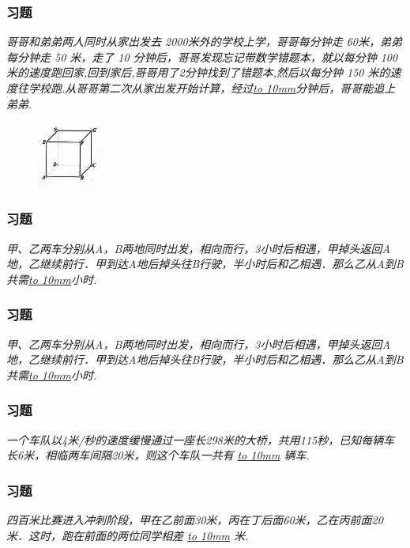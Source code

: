 \begin{frame}
    \frametitle{习题\theframecounter}
    \textit{哥哥和弟弟两人同时从家出发去 2000米外的学校上学，哥哥每分钟走 60米，弟弟每分钟走 50 米，走了 10 分钟后，哥哥发现忘记带数学错题本，就以每分钟 100 米的速度跑回家,回到家后,哥哥用了2分钟找到了错题本,然后以每分钟 150 米的速度往学校跑.从哥哥第二次从家出发开始计算，经过\underline{\hbox to 10mm{}}分钟后，哥哥能追上弟弟.}
    \begin{figure}[H] 
        \centering
        \includegraphics[width=0.2\textwidth]{./pics/Chapter_4/2.png}
    \end{figure}
\end{frame}

\begin{frame}
    \frametitle{习题\theframecounter}
    \textit{甲、乙两车分别从A，B两地同时出发，相向而行，3小时后相遇，甲掉头返回A地，乙继续前行．甲到达A地后掉头往B行驶，半小时后和乙相遇．那么乙从A到B共需\underline{\hbox to 10mm{}}小时.}
\end{frame}


\begin{frame}
    \frametitle{习题\theframecounter}
    \textit{甲、乙两车分别从A，B两地同时出发，相向而行，3小时后相遇，甲掉头返回A地，乙继续前行．甲到达A地后掉头往B行驶，半小时后和乙相遇．那么乙从A到B共需\underline{\hbox to 10mm{}}小时.}
\end{frame}

\begin{frame}
    \frametitle{习题\theframecounter}
    \textit{一个车队以4米/秒的速度缓慢通过一座长298米的大桥，共用115秒，已知每辆车长6米，相临两车间隔20米，则这个车队一共有 \underline{\hbox to 10mm{}} 辆车.}
\end{frame}


\begin{frame}
    \frametitle{习题\theframecounter}
    \textit{四百米比赛进入冲刺阶段，甲在乙前面30米，丙在丁后面60米，乙在丙前面20米．这时，跑在前面的两位同学相差 \underline{\hbox to 10mm{}} 米.}
\end{frame}

